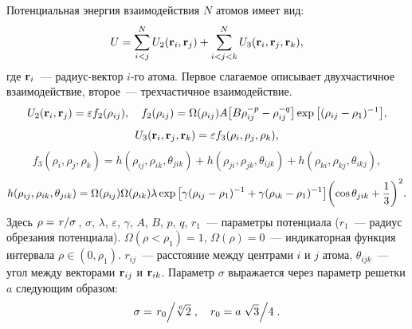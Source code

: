\documentclass[12pt,a4paper]{article}
\begin{document}
            Потенциальная энергия взаимодействия $N$ атомов имеет вид:
            \begin{equation*}
                U=\sum\limits_{i<j}^N U_2(\vb{r}_i,\vb{r}_j) + \sum\limits_{i<j<k}^N U_3(\vb{r}_i,\vb{r}_j,\vb{r}_k),
            \end{equation*}
            где $\vb{r}_i$~--- радиус-вектор $i$-го атома. Первое слагаемое описывает двухчастичное взаимодействие, второе~--- трехчастичное взаимодействие.
            \begin{equation*}
                U_2(\vb{r}_i,\vb{r}_j) = \varepsilon f_2(\rho_{ij}), \quad
                f_2(\rho_{ij}) = \Omega(\rho_{ij}) A \qty[
                    B \rho_{ij}^{-p} - \rho_{ij}^{-q}
                ] \exp\qty[(\rho_{ij}-\rho_1)^{-1}],
            \end{equation*}
            \begin{equation*}
                U_3(\vb{r}_i,\vb{r}_j,\vb{r}_k) = \varepsilon f_3(\rho_{i},\rho_{j},\rho_{k}),
            \end{equation*}
            \begin{equation*}
                f_3(\rho_{i},\rho_{j},\rho_{k}) = h(\rho_{ij},\rho_{ik},\theta_{jik}) + h(\rho_{ji},\rho_{jk},\theta_{ijk}) + h(\rho_{ki},\rho_{kj},\theta_{ikj}),
            \end{equation*}
            \begin{equation*}
                h(\rho_{ij},\rho_{ik},\theta_{jik}) = \Omega(\rho_{ij}) \Omega(\rho_{ik}) \lambda \exp\qty[\gamma (\rho_{ij}-\rho_1)^{-1} + \gamma (\rho_{ik}-\rho_1)^{-1}] \qty(\cos\theta_{jik} + \frac{1}{3})^2 .
            \end{equation*}
            Здесь $\rho=\flatfrac{r}{\sigma}$, $\sigma$, $\lambda$, $\varepsilon$, $\gamma$, $A$, $B$, $p$, $q$, $r_1$~--- параметры потенциала ($r_1$~--- радиус обрезания потенциала). $\Omega(\rho < \rho_1) = 1$, $\Omega(\rho) = 0$~--- индикаторная функция интервала $\rho \in (0,\rho_1)$. $r_{ij}$~--- расстояние между центрами $i$ и $j$ атома, $\theta_{ijk}$~--- угол между векторами $\vb{r}_{ij}$ и $\vb{r}_{ik}$. Параметр $\sigma$ выражается через параметр решетки $a$ следующим образом:
            \begin{equation*}
                \sigma = \flatfrac{r_0}{\sqrt[6]{2}}, \quad r_0 = a \flatfrac{\sqrt{3}}{4} .
            \end{equation*}
\end{document}
